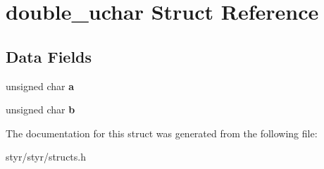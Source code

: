 \hypertarget{structdouble__uchar}{}\section{double\+\_\+uchar Struct Reference}
\label{structdouble__uchar}
\subsection*{Data Fields}
\begin{DoxyCompactItemize}
\item 
unsigned char {\bfseries a}\hypertarget{structdouble__uchar_a24420a9beaac7cee08b5e255a4c29db1}{}\label{structdouble__uchar_a24420a9beaac7cee08b5e255a4c29db1}

\item 
unsigned char {\bfseries b}\hypertarget{structdouble__uchar_a41cede1b4c0d05cff170ad5761f70964}{}\label{structdouble__uchar_a41cede1b4c0d05cff170ad5761f70964}

\end{DoxyCompactItemize}


The documentation for this struct was generated from the following file\+:\begin{DoxyCompactItemize}
\item 
styr/styr/structs.\+h\end{DoxyCompactItemize}
